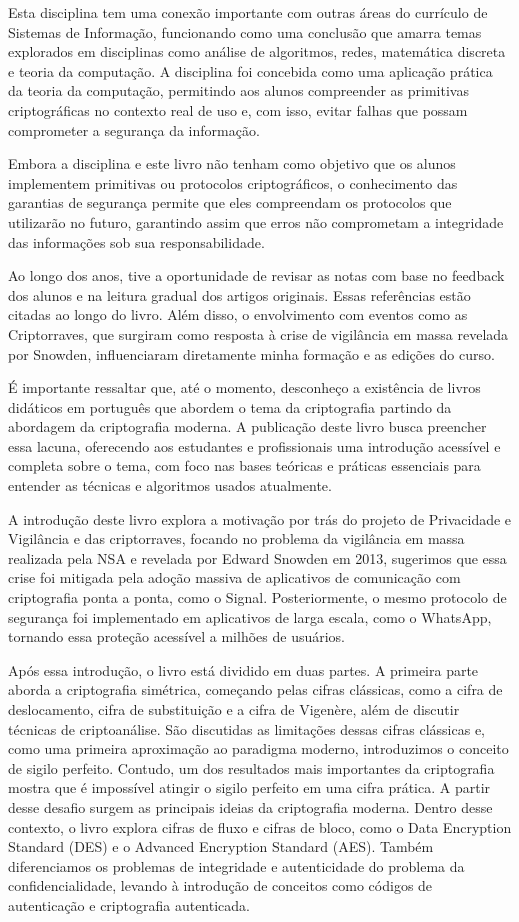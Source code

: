 Esta disciplina tem uma conexão importante com outras áreas do currículo de Sistemas de Informação, funcionando como uma conclusão que amarra temas explorados em disciplinas como análise de algoritmos, redes, matemática discreta e teoria da computação.
A disciplina foi concebida como uma aplicação prática da teoria da computação, permitindo aos alunos compreender as primitivas criptográficas no contexto real de uso e, com isso, evitar falhas que possam comprometer a segurança da informação.

Embora a disciplina e este livro não tenham como objetivo que os alunos implementem primitivas ou protocolos criptográficos, o conhecimento das garantias de segurança permite que eles compreendam os protocolos que utilizarão no futuro, garantindo assim que erros não comprometam a integridade das informações sob sua responsabilidade.

Ao longo dos anos, tive a oportunidade de revisar as notas com base no feedback dos alunos e na leitura gradual dos artigos originais.
Essas referências estão citadas ao longo do livro.
Além disso, o envolvimento com eventos como as Criptorraves, que surgiram como resposta à crise de vigilância em massa revelada por Snowden, influenciaram diretamente minha formação e as edições do curso.

É importante ressaltar que, até o momento, desconheço a existência de livros didáticos em português que abordem o tema da criptografia partindo da abordagem da criptografia moderna.
A publicação deste livro busca preencher essa lacuna, oferecendo aos estudantes e profissionais uma introdução acessível e completa sobre o tema, com foco nas bases teóricas e práticas essenciais para entender as técnicas e algoritmos usados atualmente.

A introdução deste livro explora a motivação por trás do projeto de Privacidade e Vigilância e das criptorraves, focando no problema da vigilância em massa realizada pela NSA e revelada por Edward Snowden em 2013, sugerimos que essa crise foi mitigada pela adoção massiva de aplicativos de comunicação com criptografia ponta a ponta, como o Signal.
Posteriormente, o mesmo protocolo de segurança foi implementado em aplicativos de larga escala, como o WhatsApp, tornando essa proteção acessível a milhões de usuários.

Após essa introdução, o livro está dividido em duas partes.
A primeira parte aborda a criptografia simétrica, começando pelas cifras clássicas, como a cifra de deslocamento, cifra de substituição e a cifra de Vigenère, além de discutir técnicas de criptoanálise.
São discutidas as limitações dessas cifras clássicas e, como uma primeira aproximação ao paradigma moderno, introduzimos o conceito de sigilo perfeito.
Contudo, um dos resultados mais importantes da criptografia mostra que é impossível atingir o sigilo perfeito em uma cifra prática.
A partir desse desafio surgem as principais ideias da criptografia moderna.
Dentro desse contexto, o livro explora cifras de fluxo e cifras de bloco, como o Data Encryption Standard (DES) e o Advanced Encryption Standard (AES).
Também diferenciamos os problemas de integridade e autenticidade do problema da confidencialidade, levando à introdução de conceitos como códigos de autenticação e criptografia autenticada.

